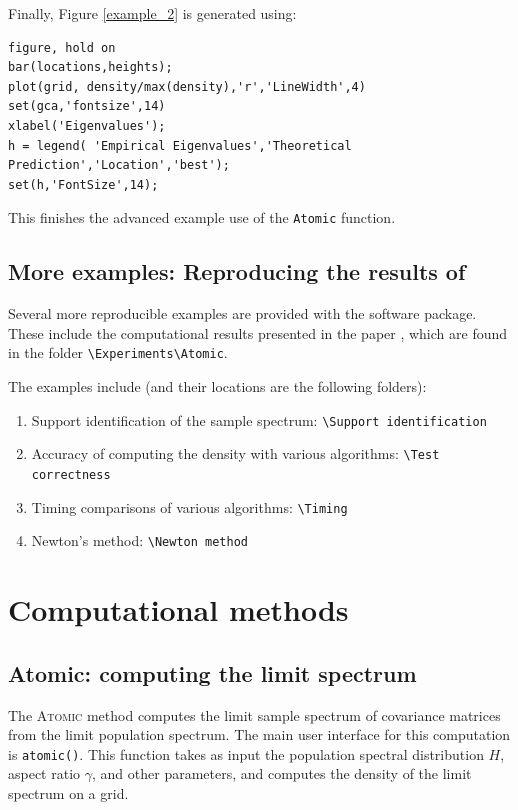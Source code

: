 \documentclass[english,11pt]{article} %
\begin{document}
Finally, Figure \ref{example_2} is generated using:


\begin{verbatim}
figure, hold on
bar(locations,heights);
plot(grid, density/max(density),'r','LineWidth',4)
set(gca,'fontsize',14)
xlabel('Eigenvalues');
h = legend( 'Empirical Eigenvalues','Theoretical Prediction','Location','best');
set(h,'FontSize',14);
\end{verbatim}

This finishes the advanced example use of the \verb+Atomic+ function. 

\subsection{More examples: Reproducing the results of \cite{dobriban2015precise}}

Several more reproducible examples are provided with the software package. These include the computational results presented in the paper \cite{dobriban2015precise}, which are found in the folder \verb+\Experiments\Atomic+. 

The examples include (and their locations are the following folders):

\begin{enumerate}
\item Support identification of the sample spectrum: \verb+\Support identification+
\item Accuracy of computing the density with various algorithms: \verb+\Test correctness+
\item Timing comparisons of various algorithms: \verb+\Timing+ 
\item Newton's method: \verb+\Newton method+
\end{enumerate}



\section{Computational methods}
\label{methods}

\subsection{Atomic: computing the limit spectrum}
\label{atomic_description}

The \textsc{Atomic} method computes the limit sample spectrum of covariance matrices from the limit population spectrum. The  main user interface for this computation is \verb+atomic()+. This function takes as input the population spectral distribution $H$, aspect ratio $\gamma$, and other parameters, and computes the density of the limit spectrum on a grid. 
\end{document}
